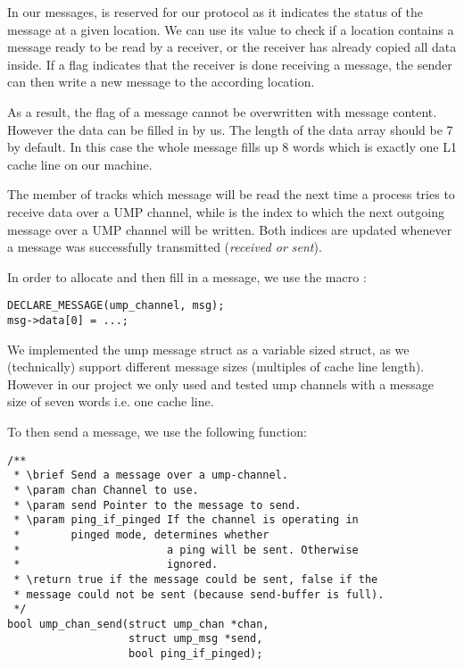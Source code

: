 In our messages, is reserved for our protocol as it indicates the status of the message at a given location. We can use its value to check if a location contains a message ready to be read by a receiver, or the receiver has already copied all data inside. If a flag indicates that the receiver is done receiving a message, the sender can then write a new message to the according location.

As a result, the flag of a message cannot be overwritten with message content. However the data can be filled in by us. The length of the data array should be 7 by default. In this case the whole message fills up 8 words which is exactly one L1 cache line on our machine.

The member  of  tracks which message will be read the next time a process tries to receive data over a UMP channel, while  is the index to which the next outgoing message over a UMP channel will be written. Both indices are updated whenever a message was successfully transmitted (\emph{received or sent}).


In order to allocate and then fill in a message, we use the macro :
\begin{mdframed}[style=myframe]
\begin{verbatim}
DECLARE_MESSAGE(ump_channel, msg);
msg->data[0] = ...;
\end{verbatim}
\end{mdframed}

We implemented the ump message struct as a variable sized struct, as we (technically) support
different message sizes (multiples of cache line length). However in our project
we only used and tested ump channels with a message size of seven words i.e. one cache line.


To then send a message, we use the following function:
\begin{mdframed}[style=myframe]
\begin{verbatim}
/**
 * \brief Send a message over a ump-channel.
 * \param chan Channel to use.
 * \param send Pointer to the message to send.
 * \param ping_if_pinged If the channel is operating in
 *        pinged mode, determines whether
 *                       a ping will be sent. Otherwise
 *                       ignored.
 * \return true if the message could be sent, false if the
 * message could not be sent (because send-buffer is full).
 */
bool ump_chan_send(struct ump_chan *chan,
                   struct ump_msg *send,
                   bool ping_if_pinged);
\end{verbatim}
\end{mdframed}

